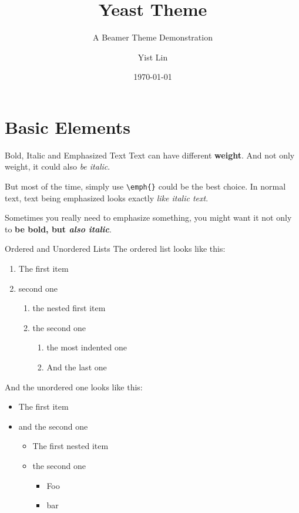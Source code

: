\documentclass[10pt]{beamer}
\title{Yeast Theme}
\subtitle{A Beamer Theme Demonstration}
\author{Yist Lin}
\date{\today}
\begin{document}
\maketitle

\maketoc

\section{Basic Elements}

\begin{frame}{Bold, Italic and Emphasized Text}
  Text can have different \textbf{weight}.
  And not only weight, it could also \textit{be italic}.
  
  But most of the time, simply use \texttt{\textbackslash{}emph\{\}} could be the best choice.
  In normal text, text being emphasized looks exactly \emph{like italic text}.
  
  Sometimes you really need to emphasize something, you might want it not only to \textbf{be bold, but \textit{also italic}}.
\end{frame}

\begin{frame}{Ordered and Unordered Lists}
  The ordered list looks like this:
  \begin{enumerate}
    \item The first item
    \item second one
    \begin{enumerate}
      \item the nested first item
      \item the second one
      \begin{enumerate}
        \item the most indented one
        \item And the last one
      \end{enumerate}
    \end{enumerate}
  \end{enumerate}

  And the unordered one looks like this:
  \begin{itemize}
    \item The first item
    \item and the second one
    \begin{itemize}
      \item The first nested item
      \item the second one
      \begin{itemize}
        \item Foo
        \item bar
      \end{itemize}
    \end{itemize}
  \end{itemize}
\end{frame}
\end{document}
